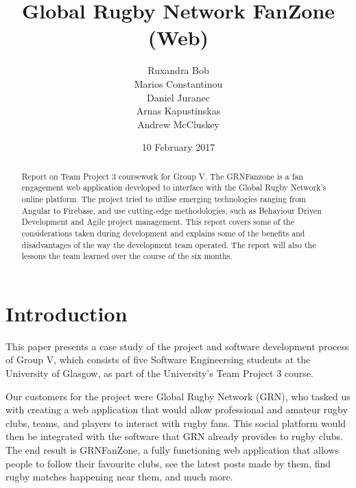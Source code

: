 \documentclass{l3proj}
\begin{document}
\title{Global Rugby Network FanZone (Web)}
\author{Ruxandra Bob \\
		Marios Constantinou \\
        Daniel Juranec \\
        Arnas Kapustinskas \\
        Andrew McCluskey}
\date{10 February 2017}
\maketitle
\begin{abstract}
Report on Team Project 3 coursework for Group V. The GRNFanzone is a
 fan engagement web application developed to interface with the Global Rugby
 Network's online platform. The project tried to utilise
 emerging technologies ranging from Angular to Firebase, and use
 cutting-edge methodologies, such as Behaviour Driven Development and Agile
 project management. This report covers some of the considerations taken
 during development and explains some of the benefits and disadvantages
 of the way the development team operated. The report will also the lessons
 the team learned over the course of the six months.
\end{abstract}
\educationalconsent
\newpage
\tableofcontents
\newpage
\section{Introduction} %

This paper presents a case study of the project and software development process
 of Group V, which consists of five Software Engineersing students at the
 University of Glasgow, as part of the University's Team Project 3 course.

Our customers for the project were Global Rugby Network (GRN), who tasked us
 with creating a web application that would allow professional and amateur
 rugby clubs, teams, and players to interact with rugby fans. This social
 platform would then be integrated with the software that GRN already provides
 to rugby clubs. The end result is GRNFanZone, a fully functioning web application
 that allows people to follow their favourite clubs, see the latest posts
 made by them, find rugby matches happening near them, and much more.
\end{document}
